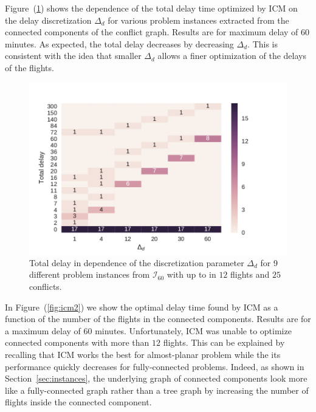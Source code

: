 Figure~(\ref{fig:icm1}) shows the dependence of the total delay time optimized by ICM on the delay discretization $\Delta_d$ for various problem instances extracted from the connected components of the conflict graph.
Results are for maximum delay of 60 minutes. 
As expected, the total delay decreases by decreasing $\Delta_d$.
This is consistent with the idea that smaller $\Delta_d$ allows a finer optimization of the delays of the flights.


\begin{figure}[htpb]
  \includegraphics[width=\columnwidth]{pics/qubo_icm/qubo_icm_3.pdf}
    \caption{Total delay in dependence of the discretization parameter $\Delta_d$ for 9 different problem instances from $\mathcal{I}_{60}$ with up to in $12$ flights and $25$ conflicts.}
\label{fig:icm1}
\end{figure}

In Figure~(\ref{fig:icm2}) we show the optimal delay time found by ICM as a
function of the number of the flights in the connected components. Results are
for a maximum delay of 60 minutes. Unfortunately, ICM was unable to optimize
connected components with more than $12$ flights. This can be explained by
recalling that ICM works the best for almost-planar problem while the
its performance quickly decreases for fully-connected problems. Indeed, as shown
in Section~\ref{sec:instances}, the underlying graph of connected components
look more like a fully-connected graph rather than a tree graph by increasing
the number of flights inside the connected component.

